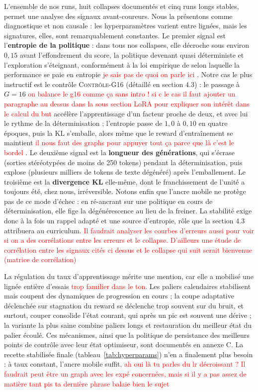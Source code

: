 \documentclass[11pt,a4paper]{article}
\begin{document}
L'ensemble de nos runs, huit collapses documentés et cinq runs longs stables, permet une analyse des signaux avant-coureurs. Nous la présentons comme diagnostique et non causale : les hyperparamètres varient entre lignées, mais les signatures, elles, sont remarquablement constantes. Le premier signal est l'\textbf{entropie de la politique} : dans tous nos collapses, elle décroche sous environ $0{,}15$ avant l'effondrement du score, la politique devenant quasi déterministe et l'exploration s'éteignant, conformément à la loi empirique de \cite{cui2025entropy} selon laquelle la performance se paie en entropie \textcolor{red}{je sais pas de quoi on parle ici} . Notre cas le plus instructif est le contrôle \textsc{Contrôle-G16} (détaillé en section 4.3) : le passage à $G=16$ \textcolor{red}{on balance le g16 comme ça sans intro ! si c le cas il faut ajouter un paragraphe au dessus dans la sous section LoRA pour expliquer son intérêt dans le calcul du but} accélère l'apprentissage d'un facteur proche de deux, et avec lui le rythme de la déterminisation ; l'entropie passe de $1{,}0$ à $0{,}10$ en quatre époques, puis la KL s'emballe, alors même que le reward d'entraînement se maintient \textcolor{red}{il nous faut des graphs pour appuyer tout ça parce que là c'est le bordel} . Le deuxième signal est la \textbf{longueur des générations}, qui s'écrase (sorties stéréotypées de moins de 250 tokens) pendant la déterminisation, puis explose (plusieurs milliers de tokens de texte dégénéré) après l'emballement. Le troisième est la \textbf{divergence KL} elle-même, dont le franchissement de l'unité a toujours été, chez nous, irréversible. Notons enfin que l'ancre mobile ne protège pas de ce mode d'échec : en ré-ancrant sur une politique en cours de déterminisation, elle fige la dégénérescence au lieu de la freiner. La stabilité exige donc à la fois un rappel adapté et une source d'entropie, rôle que la section 4.3 attribuera au curriculum. \textcolor{red}{Il faudrait analyser les courbes d'erreurs aussi pour voir si on a des corrélations entre les erreurs et le collapse. D'ailleurs une étude de corrélation entre les signaux cités ci dessus et le collapse qui suit serait bienvenue (matrice de corrélation)} 

La régulation du taux d'apprentissage mérite une mention, car elle a mobilisé une lignée entière d'essais \textcolor{red}{trop familier dans le ton}. Les paliers calendaires stabilisent mais coupent des dynamiques de progression en cours ; la coupe adaptative déclenchée sur stagnation du reward se déclenche trop souvent sur du bruit, et surtout, couper consolide l'état courant, qui après un pic est souvent une dérive ; la variante la plus saine combine paliers longs et restauration du meilleur état du palier écoulé. Ces mécanismes, ainsi que la politique de persistance des meilleurs points de contrôle avec leur état optimiseur, sont documentés en annexe C. La recette stabilisée finale (tableau~\ref{tab:hyperparams}) n'en a finalement plus besoin : à taux constant, l'ancre mobile suffit. \textcolor{red}{ah oui là tu parles du lr décroissant ? Il faudrait peut être un graph avec les expé concernées, mais si il y a pas assez de matière tant pis ta dernière phrase balaie bien le sujet} 
\end{document}
